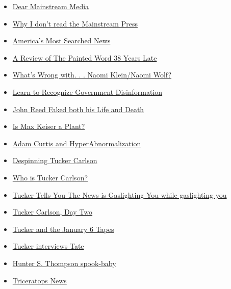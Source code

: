 \documentclass{article}
\newcommand{\insertmydocument}[2]{ %
  \item \href{http://www.mileswmathis.com/#2}{#1}
}
\begin{document}
\begin{itemize}
\begin{itemize}
\begin{itemize}
      \insertmydocument{Dear Mainstream Media}{msm.pdf}
      \insertmydocument{Why I don't read the Mainstream Press}{rs.pdf}
      \insertmydocument{America's Most Searched News}{semsim.pdf}
      \insertmydocument{A Review of The Painted Word 38 Years Late}{wolfe.pdf}
      \insertmydocument{What's Wrong with. . . Naomi Klein/Naomi Wolf?}{naomi.pdf}
      \insertmydocument{Learn to Recognize Government Disinformation}{glenn.pdf}
      \insertmydocument{John Reed Faked both his Life and Death}{reed.pdf}
      \insertmydocument{Is Max Keiser a Plant?}{max.pdf}
      \insertmydocument{Adam Curtis and HyperAbnormalization}{hyper.pdf}
      \insertmydocument{Despinning Tucker Carlson}{tucker.pdf}
      \insertmydocument{Who is Tucker Carlson?}{tucker2.pdf}
      \insertmydocument{Tucker Tells You The News is Gaslighting You while gaslighting you}{tuck2.pdf}
      \insertmydocument{Tucker Carlson, Day Two}{brand.pdf}
      \insertmydocument{Tucker and the January 6 Tapes}{tuck4.pdf}
      \insertmydocument{Tucker interviews Tate}{tate3.pdf}
      \insertmydocument{Hunter S. Thompson spook-baby}{hunter.pdf}
      \insertmydocument{Triceratops News}{tricer.pdf}
    \end{itemize}
  \end{itemize}
\end{itemize}
\end{document}
